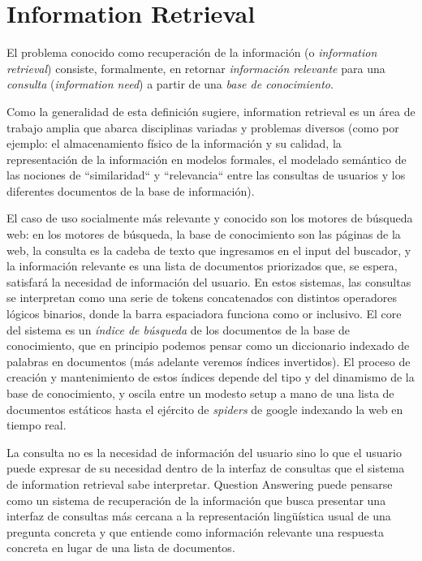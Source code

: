 \section{Information Retrieval}
\label{sec:information-retrieval}
\label{subsec:information-retrieval}

El problema conocido como recuperación de la información (o \textit{information retrieval}) consiste, formalmente, en retornar \textit{información relevante} para una \textit{consulta} (\textit{information need}) a partir de una \textit{base de conocimiento}. 

Como la generalidad de esta definición sugiere, information retrieval es un área de trabajo amplia que abarca disciplinas variadas y problemas diversos (como por ejemplo: el almacenamiento físico de la información y su calidad, la representación de la información en modelos formales, el modelado semántico de las nociones de ``similaridad`` y ``relevancia`` entre las consultas de usuarios y los diferentes documentos de la base de información). 

El caso de uso socialmente más relevante y conocido son los motores de búsqueda web: en los motores de búsqueda, la base de conocimiento son las páginas de la web, la consulta es la cadeba de texto que ingresamos en el input del buscador, y la información relevante es una lista de documentos priorizados que, se espera, satisfará la necesidad de información del usuario. En estos sistemas, las consultas se interpretan como una serie de tokens concatenados con distintos operadores lógicos binarios, donde la barra espaciadora funciona como or inclusivo. El core del sistema es un \textit{índice de búsqueda} de los documentos de la base de conocimiento, que en principio podemos pensar como un diccionario indexado de palabras en documentos (más adelante veremos índices invertidos). El proceso de creación y mantenimiento de estos índices depende del tipo y del dinamismo de la base de conocimiento, y oscila entre un modesto setup a mano de una lista de documentos estáticos hasta el ejército de \textit{spiders} de google indexando la web en tiempo real. 

La consulta no es la necesidad de información del usuario sino lo que el usuario puede expresar de su necesidad dentro de la interfaz de consultas que el sistema de information retrieval sabe interpretar. Question Answering puede pensarse como un sistema de recuperación de la información que busca presentar una interfaz de consultas más cercana a la representación lingüística usual de una pregunta concreta y que entiende como información relevante una respuesta concreta en lugar de una lista de documentos. 

